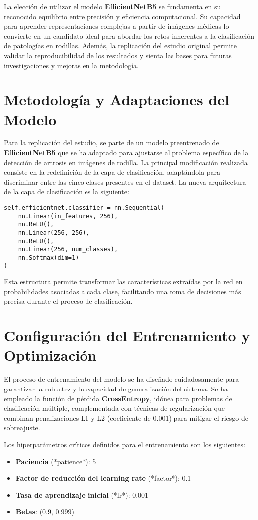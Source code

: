 \documentclass[11pt,spanish,listoffigures,listoftables]{tfgetsinf}
\begin{document}
La elección de utilizar el modelo \textbf{EfficientNetB5} se fundamenta en su reconocido equilibrio entre precisión y eficiencia computacional. Su capacidad para aprender representaciones complejas a partir de imágenes médicas lo convierte en un candidato ideal para abordar los retos inherentes a la clasificación de patologías en rodillas. Además, la replicación del estudio original permite validar la reproducibilidad de los resultados y sienta las bases para futuras investigaciones y mejoras en la metodología.

\section{Metodología y Adaptaciones del Modelo}
Para la replicación del estudio, se parte de un modelo preentrenado de \textbf{EfficientNetB5} que se ha adaptado para ajustarse al problema específico de la detección de artrosis en imágenes de rodilla. La principal modificación realizada consiste en la redefinición de la capa de clasificación, adaptándola para discriminar entre las cinco clases presentes en el dataset. La nueva arquitectura de la capa de clasificación es la siguiente:

\begin{verbatim}
self.efficientnet.classifier = nn.Sequential(
    nn.Linear(in_features, 256),
    nn.ReLU(),
    nn.Linear(256, 256),
    nn.ReLU(),
    nn.Linear(256, num_classes),
    nn.Softmax(dim=1)
)
\end{verbatim}

Esta estructura permite transformar las características extraídas por la red en probabilidades asociadas a cada clase, facilitando una toma de decisiones más precisa durante el proceso de clasificación.

\section{Configuración del Entrenamiento y Optimización}
El proceso de entrenamiento del modelo se ha diseñado cuidadosamente para garantizar la robustez y la capacidad de generalización del sistema. Se ha empleado la función de pérdida \textbf{CrossEntropy}, idónea para problemas de clasificación múltiple, complementada con técnicas de regularización que combinan penalizaciones L1 y L2 (coeficiente de 0.001) para mitigar el riesgo de sobreajuste.

Los hiperparámetros críticos definidos para el entrenamiento son los siguientes:
\begin{itemize}
    \item \textbf{Paciencia} (*patience*): 5
    \item \textbf{Factor de reducción del learning rate} (*factor*): 0.1
    \item \textbf{Tasa de aprendizaje inicial} (*lr*): 0.001
    \item \textbf{Betas}: (0.9, 0.999)
\end{itemize}
\end{document}
